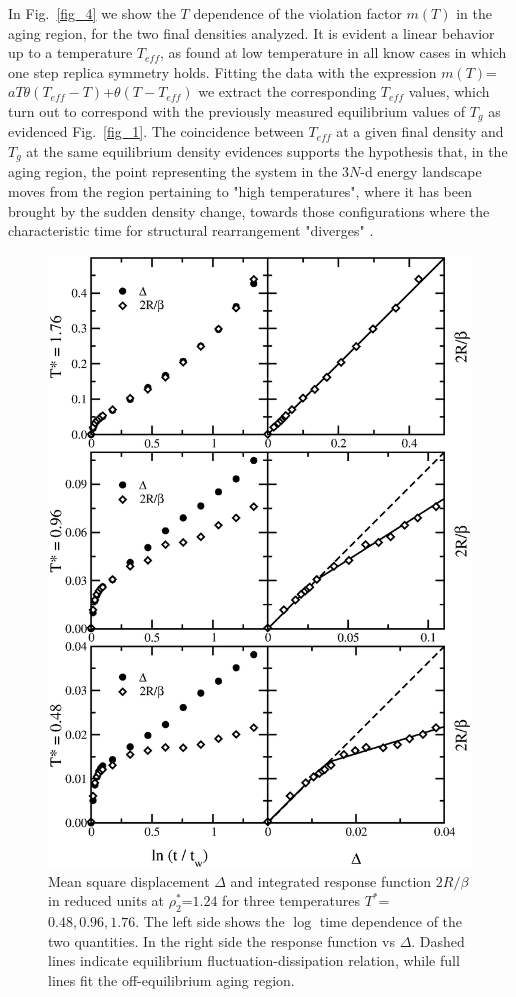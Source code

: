 In Fig.~\ref{fig_4} we show the $T$ dependence of the violation factor
$m(T)$ in the aging region, for the two final densities analyzed.
It is evident a linear behavior up to a temperature $T_{\!e\!f\!\!f}$,
as found at low temperature in all know cases in which one step replica
symmetry holds. Fitting the data with the expression
$m(T)$=$a T \theta (T_{\!e\!f\!\!f}-T)$+$\theta (T-T_{\!e\!f\!\!f})$ we
extract the corresponding $T_{\!e\!f\!\!f}$ values, which turn out to
correspond with the previously measured equilibrium values of $T_g$
as evidenced Fig.~\ref{fig_1}. The coincidence between
$T_{\!e\!f\!\!f}$ at a given final density and $T_g$ at the same equilibrium
density evidences supports the hypothesis that, in the aging region,
the point representing the system in the 3$N$-d energy landscape
moves from the region pertaining to "high temperatures", where it has
been brought by the sudden density change, towards those configurations
where the characteristic time for structural rearrangement "diverges"
\cite{bho}.
\begin{figure}[t]
\centering
\vspace{-.2cm}
\includegraphics[width=.35\textwidth]{R_C2.ps}
\caption{Mean square displacement $\Delta$ and integrated response function
$2R/\beta$ in reduced units at $\rho^*_2$=$1.24$ for three temperatures
$T^*$=$0.48, 0.96, 1.76$.
The left side shows the $\log$ time dependence of the two quantities.
In the right side the response function vs $\Delta$. Dashed lines indicate
equilibrium fluctuation-dissipation relation, while full lines fit the
off-equilibrium aging region.
}
\label{fig_3}
\end{figure}

